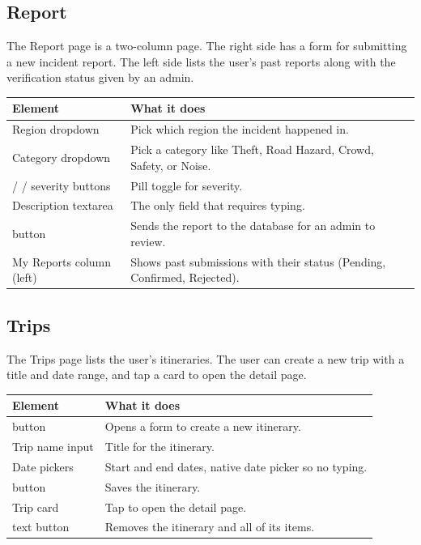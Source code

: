 \documentclass[11pt,letterpaper]{article}
\let\oldtexttt\texttt
\renewcommand{\texttt}[1]{{\color{inlinecode}\oldtexttt{#1}}}
\begin{document}
\subsection{Report}

The Report page is a two-column page. The right side has a form for submitting a new incident report. The left side lists the user's past reports along with the verification status given by an admin.

\begin{table}[H]
    \centering
    \begin{tabularx}{\textwidth}{lX}
        \toprule
        \textbf{Element} & \textbf{What it does} \\
        \midrule
        Region dropdown & Pick which region the incident happened in. \\
        Category dropdown & Pick a category like Theft, Road Hazard, Crowd, Safety, or Noise. \\
        \texttt{Low} / \texttt{Medium} / \texttt{High} severity buttons & Pill toggle for severity. \\
        Description textarea & The only field that requires typing. \\
        \texttt{Submit Report} button & Sends the report to the database for an admin to review. \\
        My Reports column (left) & Shows past submissions with their status (Pending, Confirmed, Rejected). \\
        \bottomrule
    \end{tabularx}
\end{table}

\subsection{Trips}

The Trips page lists the user's itineraries. The user can create a new trip with a title and date range, and tap a card to open the detail page.

\begin{table}[H]
    \centering
    \begin{tabularx}{\textwidth}{lX}
        \toprule
        \textbf{Element} & \textbf{What it does} \\
        \midrule
        \texttt{+ New} button & Opens a form to create a new itinerary. \\
        Trip name input & Title for the itinerary. \\
        Date pickers & Start and end dates, native date picker so no typing. \\
        \texttt{Create} button & Saves the itinerary. \\
        Trip card & Tap to open the detail page. \\
        \texttt{Delete} text button & Removes the itinerary and all of its items. \\
        \bottomrule
    \end{tabularx}
\end{table}
\end{document}
